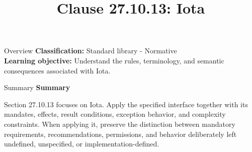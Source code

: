 \documentclass[10pt,letterpaper]{article}
\title{Clause 27.10.13: Iota}
\author{}
\date{}
\begin{document}
\maketitle
\begin{CornellOverviewBox}{Overview}
\textbf{Classification:} Standard library - Normative\\[2pt]
\textbf{Learning objective:} Understand the rules, terminology, and semantic consequences associated with Iota.
\end{CornellOverviewBox}\begin{CornellSummaryBox}{Summary}
{\sffamily\bfseries\color{Accent} Summary}\par\vspace{3pt}Section 27.10.13 focuses on Iota. Apply the specified interface together with its mandates, effects, result conditions, exception behavior, and complexity constraints. When applying it, preserve the distinction between mandatory requirements, recommendations, permissions, and behavior deliberately left undefined, unspecified, or implementation-defined.
\end{CornellSummaryBox}
\end{document}
